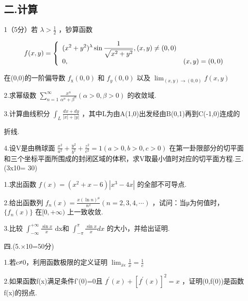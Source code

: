 \documentclass[11pt,fontset=fandol]{ctexart}
\begin{document}
\subsection{二.计算}\label{ux4e8c.ux8ba1ux7b97}

1（5分）若 \(\lambda > \frac { 1 } { 2 }\) ，钞算函数

\[
f ( x , y ) = \left\{ \begin{array} { l l } { \displaystyle ( x ^ { 2 } + y ^ { 2 } ) ^ { \lambda } \sin \frac { 1 } { \sqrt { x ^ { 2 } + y ^ { 2 } } } , ( x , y ) \neq ( 0 , 0 ) } \\ { 0 , } & { ( x , y ) = ( 0 , 0 ) } \end{array} \right.
\]

在(0,0)的一阶偏导数 \(f _ { \mathrm { x } } ( 0 , 0 )\) 和
\(f _ { y } ( 0 , 0 )\) 以及
\(\lim _ { ( x , y ) \to ( 0 , 0 ) } f ( x , y )\)

2.求幂级数
\(\sum _ { n = 1 } ^ { \infty } { \frac { x ^ { n } } { \alpha ^ { n } + \beta ^ { n } } } ( \alpha > 0 , \beta > 0 )\)
的收敛域.

3.计算曲线积分
\(\int _ { L } { \frac { d x + d y } { \left| x \right| + \left| y \right| } }\)
，其中L为由A(1,0)出发经由B(0,1)再到C(-1,0)连成的

折线.

4.设V是由椭球面
\(\frac { x ^ { 2 } } { a ^ { 2 } } + \frac { y ^ { 2 } } { b ^ { 2 } } + \frac { z ^ { 2 } } { c ^ { 2 } } = 1 \left( a > 0 , b > 0 , c > 0 \right)\)
在第一卦限部分的切平面和三个坐标平面所围成的封闭区域的体积，求V取最小值时对应的切平面方程.三.(3x10=
30)

1.求出函数
\(f ( x ) = ( x ^ { 2 } + x - 6 ) \left| x ^ { 3 } - 4 x \right|\)
的全部不可导点.

2.给出函数列
\(f _ { n } ( x ) = { \frac { x ( \ln n ) ^ { \mu } } { n ^ { x } } } ( n = 2 , 3 , 4 , \cdots )\)
，试问：当μ为何值时， \(\{ f _ { n } ( x ) \}\) 在\([ 0 , + \infty )\)
上一致收敛.

3.比较
\(\int _ { - \infty } ^ { + \infty } { \frac { \sin { x } } { x } }\)
dx和 \(\int _ { - \pi } ^ { \pi } { \frac { \sin { x } } { x } } d x\)
的大小，并给出证明.

四.(5.×10=50分)

1.若c≠0，利用函数极限的定义证明
\(\lim _ { \stackrel { . . . } { x }  \epsilon } \frac { 1 } { x } = \frac { 1 } { e }\)

2.如果函数f(x)满足条件f'(0)=0且
\(f ^ { \prime } ( x ) + \left[ f ^ { \prime } ( x ) \right] ^ { 2 } = x\)
，证明(0,f(0))是函数f(x)的拐点.
\end{document}
